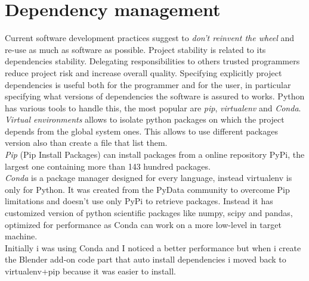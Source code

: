\section{Dependency management}
Current software development practices suggest to \textit{don't reinvent the wheel} and re-use as much as software as possible.
Project stability is related to its dependencies stability. Delegating responsibilities to others trusted programmers reduce project risk and increase overall quality. Specifying explicitly project dependencies is useful both for the programmer and for the user, in particular specifying what versions of dependencies the software is assured to works. Python has various tools to handle this, the most popular are \textit{pip}, \textit{virtualenv} and \textit{Conda}. \\
\textit{Virtual environments} allows to isolate python packages on which the project depends from the global system ones. This allows to use different packages version also than create a file that list them. \\
\textit{Pip} (Pip Install Packages) can install packages from a online repository PyPi, the largest one containing more than 143 hundred packages. \\
\textit{Conda} is a package manager designed for every language, instead virtualenv is only for Python. It was created from the PyData community to overcome Pip limitations and doesn't use only PyPi to retrieve packages. Instead it has customized version of python scientific packages like numpy, scipy and pandas, optimized for performance as Conda can work on a more low-level in target machine. \\
Initially i was using Conda and I noticed a better performance but when i create the Blender add-on code part that auto install dependencies i moved back to virtualenv+pip because it was easier to install.

